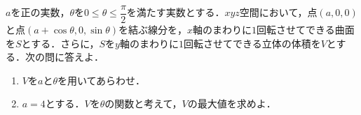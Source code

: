 $a$を正の実数，$\theta$を$0\le\theta\le\dfrac{\pi}{2}$を満たす実数とする．$xyz$空間において，点$(a,0,0)$と点$(a+\cos\theta,0,\sin\theta)$を結ぶ線分を，$x$軸のまわりに$1$回転させてできる曲面を$S$とする．さらに，$S$を$y$軸のまわりに$1$回転させてできる立体の体積を$V$とする．次の問に答えよ．
\begin{enumerate}
  \item $V$を$a$と$\theta$を用いてあらわせ．
  \item $a=4$とする．$V$を$\theta$の関数と考えて，$V$の最大値を求めよ．
\end{enumerate}